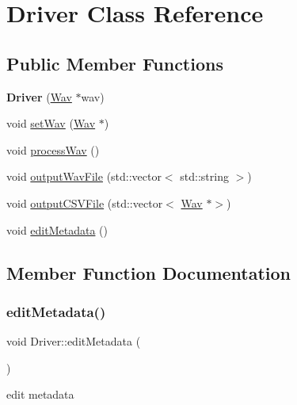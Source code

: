 \hypertarget{classDriver}{}\section{Driver Class Reference}
\label{classDriver}
\subsection*{Public Member Functions}
\begin{DoxyCompactItemize}
\item 
\mbox{\label{classDriver_add5a6c755a1e845cc3d7c0cd7e7fbc17}} 
{\bfseries Driver} (\hyperlink{classWav}{Wav} $\ast$wav)
\item 
void \hyperlink{classDriver_a5d58141395b60701ae65d3623c3053f6}{set\+Wav} (\hyperlink{classWav}{Wav} $\ast$)
\item 
void \hyperlink{classDriver_a7b8110d43dc29e26fec11f4120693714}{process\+Wav} ()
\item 
void \hyperlink{classDriver_a43544d196cd4055dced0c0ef654ffd62}{output\+Wav\+File} (std\+::vector$<$ std\+::string $>$)
\item 
void \hyperlink{classDriver_ab6ac2a7b99e934cf8a3c5ebe229eb63b}{output\+C\+S\+V\+File} (std\+::vector$<$ \hyperlink{classWav}{Wav} $\ast$$>$)
\item 
void \hyperlink{classDriver_a23d1437a01106d70634aed9271b44e49}{edit\+Metadata} ()
\end{DoxyCompactItemize}


\subsection{Member Function Documentation}
\mbox{\label{classDriver_a23d1437a01106d70634aed9271b44e49}} 
\subsubsection{\texorpdfstring{edit\+Metadata()}{editMetadata()}}
{\footnotesize\ttfamily void Driver\+::edit\+Metadata (\begin{DoxyParamCaption}{ }\end{DoxyParamCaption})}

edit metadata \mbox{\label{classDriver_ab6ac2a7b99e934cf8a3c5ebe229eb63b}} 
